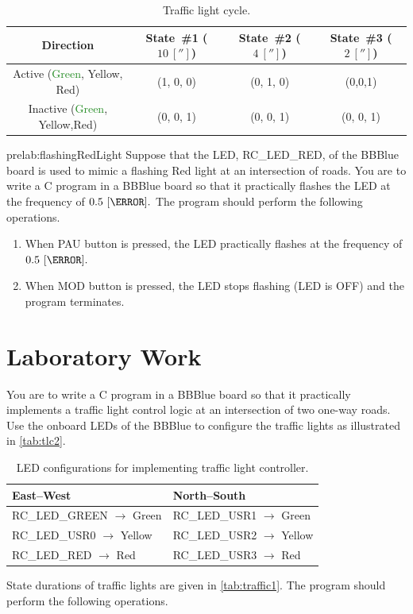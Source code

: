 \begin{table}%
\caption{Traffic light cycle.}
\label{tab:traffic1}
\centering
\begin{tabular}{c|c|c|c}
\toprule
Direction & State~\#1 ($10~[\second]$) & State~\#2 ($4~[\second]$) & State~\#3 ($2~[\second]$)\\
\toprule
Active (\textcolor{ForestGreen}{Green}, \textcolor{YellowOrange}{Yellow}, \textcolor{BrickRed}{Red}) & (1, 0, 0) & (0, 1, 0) & (0,0,1)\\
\hline
Inactive (\textcolor{ForestGreen}{Green}, \textcolor{YellowOrange}{Yellow},\textcolor{BrickRed}{Red}) & (0, 0, 1) & (0, 0, 1) & (0, 0, 1)\\
\bottomrule
\end{tabular}

\end{table}


\begin{prelab}{prelab:flashingRedLight}
  Suppose that the LED, RC\_LED\_RED, of the BBBlue board is used  to mimic a flashing Red light at an intersection of roads. You are to write a C program in a BBBlue board so that it practically flashes the LED at the frequency of $0.5~[\hertz].$ The program should perform the  following operations.
  \begin{enumerate}
  \item When PAU button is pressed, the LED practically flashes at the frequency of $0.5~[\hertz].$
  \item When MOD button is pressed, the LED stops flashing (LED is OFF) and the program terminates.      
  \end{enumerate}
\end{prelab}




\section{Laboratory Work}

You are to write a C program in a BBBlue board so that it practically implements a traffic light control logic at an intersection of  two one-way roads. Use the onboard LEDs of the BBBlue to configure the traffic lights as illustrated in \autoref{tab:tlc2}. %
%
\begin{table}
  \centering
  \caption{LED configurations for implementing traffic light controller. }
  \label{tab:tlc2}  
  \begin{tabular}{l|l}
    \toprule   
    East--West & North--South\\
    \toprule
    RC\_LED\_GREEN $\to$ Green & RC\_LED\_USR1 $\to$ Green\\   	    
    RC\_LED\_USR0 $\to$ Yellow  	  & RC\_LED\_USR2 $\to$ Yellow\\  
    RC\_LED\_RED 	$\to$ Red          & RC\_LED\_USR3 $\to$ Red\\  
    \bottomrule    
  \end{tabular}
\end{table}
%
State durations of traffic lights are given in  \autoref{tab:traffic1}. The program should perform the  following operations.


